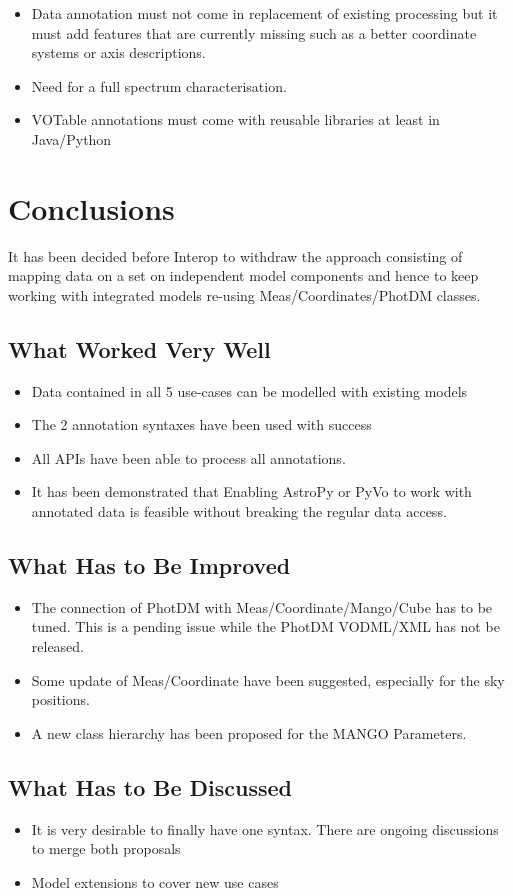 \documentclass[11pt,a4paper]{ivoa}
\begin{document}
\begin{itemize}
\item Data annotation must not come in replacement of existing processing but it must 
         add features that are currently missing such as a better coordinate systems or axis descriptions.
\item Need for a full spectrum characterisation.
\item VOTable annotations must come with reusable libraries at least in Java/Python
\end{itemize}
 
 
 \section{Conclusions}
 
 It has been decided before Interop to withdraw the approach consisting of mapping data on a set on independent model components and hence to keep working with integrated models re-using Meas/Coordinates/PhotDM classes.
 
\subsection{What Worked Very Well}

\begin{itemize}
\item Data contained in all 5 use-cases can be modelled with existing models
\item The 2 annotation syntaxes have been used with success
\item All  APIs have been able to process all annotations.
\item  It has been demonstrated that Enabling AstroPy or PyVo to work with annotated data is feasible without breaking the regular data access.
\end{itemize}

\subsection{What Has to Be Improved}

\begin{itemize}
\item The connection of PhotDM with Meas/Coordinate/Mango/Cube has to be tuned. This is a pending issue while the PhotDM VODML/XML has not be released.
\item Some update of Meas/Coordinate have been suggested, especially for the sky positions.
\item A new class hierarchy has been proposed for the MANGO Parameters.
\end{itemize}

\subsection{What Has to Be Discussed}

\begin{itemize}
\item It is very desirable to finally have one syntax. There are ongoing discussions to merge both proposals 
\item Model extensions to cover new use cases
\end{itemize}
\end{document}
